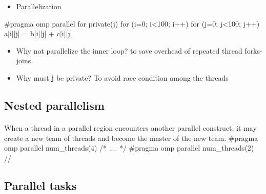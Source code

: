 \documentclass[%
twoside,                 %
final,                   %
10pt]{article}
\begin{document}
\begin{itemize}
\item Parallelization
\end{itemize}

\noindent
\bcppcod
#pragma omp parallel for private(j)
for (i=0; i<100; i++)
for (j=0; j<100; j++)
a[i][j] = b[i][j] + c[i][j]
\ecppcod

\begin{itemize}
\item Why not parallelize the inner loop? to save overhead of repeated thread forks-joins

\item Why must \textbf{j} be private? To avoid race condition among the threads
\end{itemize}

\noindent




\subsection{Nested parallelism}

\paragraph{}
When a thread in a parallel region encounters another parallel construct, it
may create a new team of threads and become the master of the new
team.
\bcppcod
#pragma omp parallel num_threads(4)
{
/* .... */
#pragma omp parallel num_threads(2)
{
//  
}
}
\ecppcod




\subsection{Parallel tasks}

\end{document}
